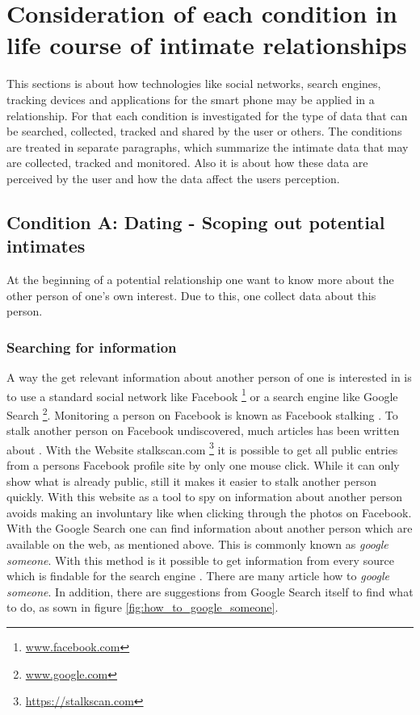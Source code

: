 \section{Consideration of each condition in life course of intimate relationships}
\label{sec:consideration_life_course_conditions}
This sections is about how technologies like social networks, search engines, tracking devices and applications for the smart phone may be applied in a relationship.
For that each condition is investigated for the type of data that can be searched, collected, tracked and shared by the user or others.
The conditions are treated in separate paragraphs, which summarize the intimate data that may are collected, tracked and monitored. Also it is about how these data are perceived by the user and how the data affect the users perception.

\subsection{Condition A: Dating - Scoping out potential intimates}
\label{subsec:A}
At the beginning of a potential relationship one want to know more about the other person of one's own interest. Due to this, one collect data about this person. 
\subsubsection{Searching for information}
A way the get relevant information about another person of one is interested in is to use a standard social network like Facebook \footnote{\url{www.facebook.com}} or a search engine like Google Search \footnote{\url{www.google.com}}.
Monitoring a person on Facebook is known as Facebook stalking \cite{levy2014intimate}. To stalk another person on Facebook undiscovered, much articles has been written about \cite{sueddeutsche_fb_stalking}. With the Website stalkscan.com \footnote{\url{https://stalkscan.com}} it is possible to get all public entries from a persons Facebook profile site by only one mouse click. While it can only show what is already public, still it makes it easier to stalk another person quickly.
With this website as a tool to spy on information about another person avoids making an involuntary like when clicking through the photos on Facebook.
With the Google Search one can find information about another person which are available on the web, as mentioned above. This is commonly known as \textit{google someone}. With this method is it possible to get information from every source which is findable for the search engine \cite{nolan2005hacking}. There are many article how to \textit{google someone}. In addition, there are suggestions from Google Search itself to find what to do, as sown in figure \ref{fig:how_to_google_someone}.

